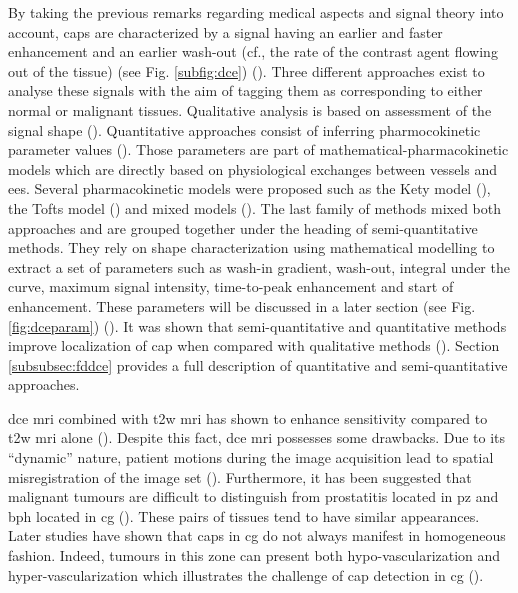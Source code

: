 \begin{enumerate}[leftmargin=*]
By taking the previous remarks regarding medical aspects and signal theory into account, \acp{cap} are characterized by a signal having an earlier and faster enhancement and an earlier wash-out (cf., the rate of the contrast agent flowing out of the tissue) (see Fig. \ref{subfig:dce}) (\cite{Verma2012}). Three different approaches exist to analyse these signals with the aim of tagging them as corresponding to either normal or malignant tissues. Qualitative analysis is based on assessment of the signal shape (\cite{Hoeks2011}). Quantitative approaches consist of inferring pharmocokinetic parameter values (\cite{Tofts2010}). Those parameters are part of mathematical-pharmacokinetic models which are directly based on physiological exchanges between vessels and \ac{ees}. Several pharmacokinetic models were proposed such as the Kety model (\cite{Kety1951}), the Tofts model (\cite{Tofts1997}) and mixed models (\cite{Larsson1996,StLawrence1998}). The last family of methods mixed both approaches and are grouped together under the heading of semi-quantitative methods. They rely on shape characterization using mathematical modelling to extract a set of parameters such as wash-in gradient, wash-out, integral under the curve, maximum signal intensity, time-to-peak enhancement and start of enhancement. These parameters will be discussed in a later section (see Fig. \ref{fig:dceparam}) (\cite{Hoeks2011,Verma2012}). It was shown that semi-quantitative and quantitative methods improve localization of \ac{cap} when compared with qualitative methods (\cite{Rosenkrantz2013}). Section \ref{subsubsec:fddce} provides a full description of quantitative and semi-quantitative approaches.

\ac{dce} \ac{mri} combined with \ac{t2w} \ac{mri} has shown to enhance sensitivity compared to \ac{t2w} \ac{mri} alone (\cite{Jager1997,Kim2005,Schlemmer2004,Zelhof2009}). Despite this fact, \ac{dce} \ac{mri} possesses some drawbacks. Due to its ``dynamic'' nature, patient motions during the image acquisition lead to spatial misregistration of the image set (\cite{Verma2012}). Furthermore, it has been suggested that malignant tumours are difficult to distinguish from prostatitis located in \ac{pz} and \ac{bph} located in \ac{cg} (\cite{Hoeks2011,Verma2012}). These pairs of tissues tend to have similar appearances. Later studies have shown that \acp{cap} in \ac{cg} do not always manifest in homogeneous fashion. Indeed, tumours in this zone can present both hypo-vascularization and hyper-vascularization which illustrates the challenge of \ac{cap} detection in \ac{cg} (\cite{Niekerk2013}).


\end{enumerate}
